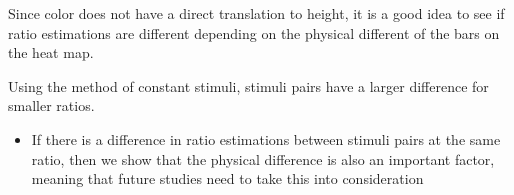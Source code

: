 \documentclass[phd]{nuthesis}
\begin{document}
Since color does not have a direct translation to height, it is a good
idea to see if ratio estimations are different depending on the physical
different of the bars on the heat map.

Using the method of constant stimuli, stimuli pairs have a larger
difference for smaller ratios.

\begin{itemize}
\tightlist
\item
  If there is a difference in ratio estimations between stimuli pairs at
  the same ratio, then we show that the physical difference is also an
  important factor, meaning that future studies need to take this into
  consideration
\end{itemize}

\backmatter



\end{document}
